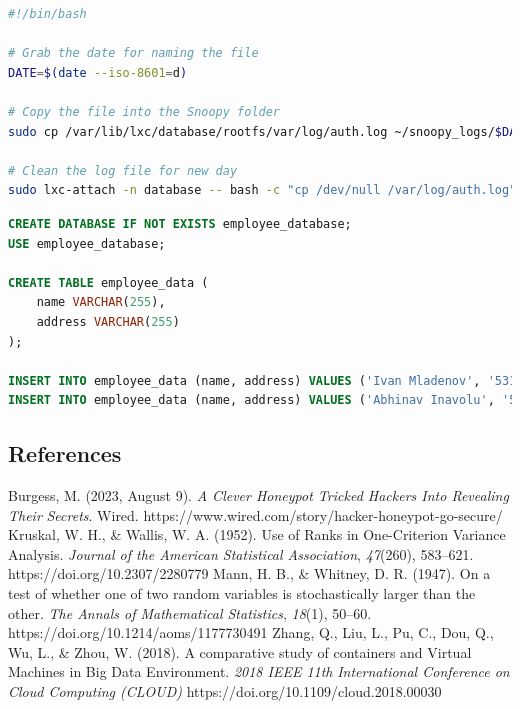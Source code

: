 \documentclass[12pt]{article}
\begin{document}
\begin{lstlisting}[caption={clean.sh},language={bash}]
#!/bin/bash

# Grab the date for naming the file
DATE=$(date --iso-8601=d)

# Copy the file into the Snoopy folder
sudo cp /var/lib/lxc/database/rootfs/var/log/auth.log ~/snoopy_logs/$DATE.log

# Clean the log file for new day
sudo lxc-attach -n database -- bash -c "cp /dev/null /var/log/auth.log"
\end{lstlisting}

\begin{lstlisting}[caption={databse.sql},language={SQL}]
CREATE DATABASE IF NOT EXISTS employee_database;
USE employee_database;

CREATE TABLE employee_data (
    name VARCHAR(255),
    address VARCHAR(255)
);

INSERT INTO employee_data (name, address) VALUES ('Ivan Mladenov', '531 Country Club Lane');
INSERT INTO employee_data (name, address) VALUES ('Abhinav Inavolu', '530 Country Club Lane');
\end{lstlisting}


\clearpage
\doublespacing
\begin{center} \section*{\normalsize{References}} \end{center}
Burgess, M. (2023, August 9). \textit{A Clever Honeypot Tricked Hackers Into Revealing Their} \newline
\indent \textit{Secrets}. Wired. https://www.wired.com/story/hacker-honeypot-go-secure/ \newline \newline
Kruskal, W. H., \& Wallis, W. A. (1952). Use of Ranks in One-Criterion Variance \newline
\indent Analysis. \textit{Journal of the American Statistical Association}, \textit{47}(260), 583–621. \newline
\indent https://doi.org/10.2307/2280779 \newline \newline
Mann, H. B., \& Whitney, D. R. (1947). On a test of whether one of two random \newline
\indent variables is stochastically larger than the other. \textit{The Annals of Mathematical Statistics}, \newline
\indent \textit{18}(1), 50–60. https://doi.org/10.1214/aoms/1177730491 \newline \newline
Zhang, Q., Liu, L., Pu, C., Dou, Q., Wu, L., \& Zhou, W. (2018). A comparative study \newline
\indent of containers and Virtual Machines in Big Data Environment. \textit{2018 IEEE 11th} \newline
\indent \textit{International Conference on Cloud Computing (CLOUD)} \newline
\indent https://doi.org/10.1109/cloud.2018.00030
\end{document}
